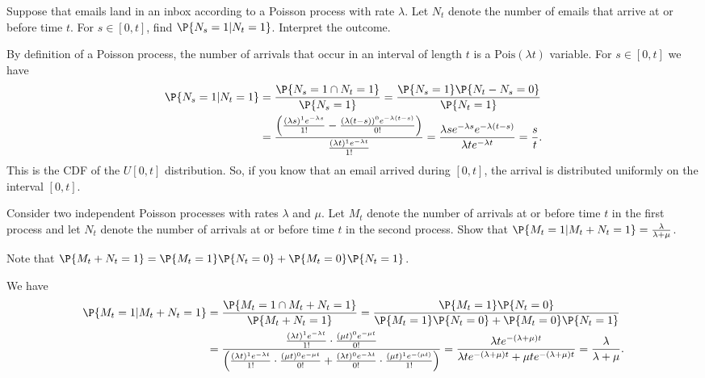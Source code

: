 	\begin{exercise}
		Suppose that emails land in an inbox according to a Poisson process with rate $\lambda$. Let $N_t$ denote the number of emails that arrive at or before time $t$. For $s \in [0,t]$, find $\P{N_s = 1 | N_t = 1}$. Interpret the outcome.
		\begin{solution}
			By definition of a Poisson process, the number of arrivals that occur in an interval of length $t$ is a $\text{Pois}(\lambda t)$ variable. For $s \in [0,t]$ we have
			\begin{align*}
				\P{N_s = 1 | N_t = 1} & = \frac{\P{N_s = 1 \cap N_t = 1}}{\P{N_s = 1}} = \frac{\P{N_s = 1} \P{N_t - N_s = 0}}{\P{N_t = 1}} \\
				& = \frac{\left(\frac{(\lambda s)^1 e^{-\lambda s}}{1!} - \frac{(\lambda (t - s))^0 e^{-\lambda (t - s)}}{0!}\right)}{\frac{(\lambda t)^1 e^{-\lambda t}}{1!}} = \frac{\lambda s e^{- \lambda s} e^{-\lambda (t - s)}}{\lambda t e^{- \lambda t}} = \frac{s}{t}.
			\end{align*}
			This is the CDF of the $U[0,t]$ distribution. So, if you know that an email arrived during $[0, t]$, the arrival is distributed uniformly on the interval $[0, t]$.
		\end{solution}
	\end{exercise}
	
	\begin{exercise}
		Consider two independent Poisson processes with rates $\lambda$ and $\mu$. Let $M_t$ denote the number of arrivals at or before time $t$ in the first process and let $N_t$ denote the number of arrivals at or before time $t$ in the second process. Show that $\P{M_t = 1 | M_t + N_t = 1} = \frac{\lambda}{\lambda + \mu}$.
		\begin{hint}
			Note that $\P{M_t + N_t = 1} = \P{M_t = 1} \P{N_t = 0} + \P{M_t = 0} \P{N_t = 1}$.
		\end{hint}

		\begin{solution}
			We have
			\begin{align*}
				\P{M_t = 1 | M_t + N_t = 1} & = \frac{\P{M_t = 1 \cap M_t + N_t = 1}}{\P{M_t + N_t = 1}} = \frac{\P{M_t = 1} \P{N_t = 0}}{\P{M_t = 1} \P{N_t = 0} + \P{M_t = 0} \P{N_t = 1}} \\
				& = \frac{\frac{(\lambda t)^1 e^{- \lambda t}}{1!} \cdot \frac{(\mu t)^0 e^{- \mu t}}{0!}}{\left(\frac{(\lambda t)^1 e^{- \lambda t}}{1!} \cdot \frac{(\mu t)^0 e^{- \mu t}}{0!} + \frac{(\lambda t)^0 e^{- \lambda t}}{0!} \cdot \frac{(\mu t)^1 e^{- (\mu t)}}{1!}\right)} = \frac{\lambda t e^{- (\lambda + \mu)t}}{\lambda t e^{- (\lambda + \mu)t} + \mu t e^{- (\lambda + \mu)t}} = \frac{\lambda}{\lambda + \mu}.
			\end{align*}
		\end{solution}
	\end{exercise}



